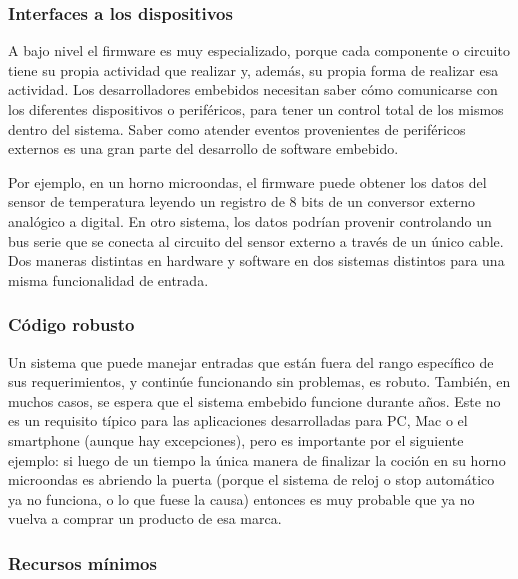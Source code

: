 \documentclass[output=paper, 
colorlinks,
citecolor=brown,
newtxmath
]{langscibook}
\begin{document}
\subsubsection *{Interfaces a los dispositivos}

A bajo nivel el firmware es muy especializado, porque cada componente o circuito 
tiene su propia actividad que realizar y, además, su propia forma de realizar esa actividad. 
Los desarrolladores embebidos necesitan saber cómo comunicarse con 
los diferentes dispositivos o periféricos, para tener un control total de los mismos dentro
del sistema. Saber como atender eventos provenientes de periféricos externos es una gran 
parte del desarrollo de software embebido.

Por ejemplo, en un horno microondas, el firmware puede obtener los datos 
del sensor de temperatura leyendo un registro de 8 bits de un 
conversor externo analógico a digital. En otro sistema, los datos 
podrían provenir controlando un bus serie que se conecta al 
circuito del sensor externo a través de un único cable.
Dos maneras distintas en hardware y software en dos sistemas distintos
para una misma funcionalidad de entrada.


\subsubsection *{Código robusto}

Un sistema que puede manejar entradas que están fuera del rango
específico de sus requerimientos, y continúe funcionando 
sin problemas, es robuto.
También, en muchos casos, se espera que el sistema embebido funcione durante años.
Este no es un requisito típico para las aplicaciones desarrolladas para PC, Mac o el smartphone (aunque hay excepciones),
pero es importante por el siguiente ejemplo: si luego de un tiempo la única manera de finalizar la
coción en su horno microondas es abriendo la puerta (porque el sistema de reloj o stop automático ya no funciona,
o lo que fuese la causa) entonces es muy probable
que ya no vuelva a comprar un producto de esa marca.





\subsubsection *{Recursos mínimos}
\end{document}
